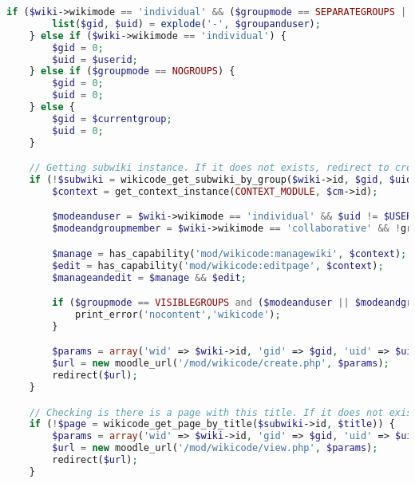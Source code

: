 \begin{lstlisting}[language=PHP]
    if ($wiki->wikimode == 'individual' && ($groupmode == SEPARATEGROUPS || $groupmode == VISIBLEGROUPS)) {
        list($gid, $uid) = explode('-', $groupanduser);
    } else if ($wiki->wikimode == 'individual') {
        $gid = 0;
        $uid = $userid;
    } else if ($groupmode == NOGROUPS) {
        $gid = 0;
        $uid = 0;
    } else {
        $gid = $currentgroup;
        $uid = 0;
    }

    // Getting subwiki instance. If it does not exists, redirect to create page
    if (!$subwiki = wikicode_get_subwiki_by_group($wiki->id, $gid, $uid)) {
        $context = get_context_instance(CONTEXT_MODULE, $cm->id);

        $modeanduser = $wiki->wikimode == 'individual' && $uid != $USER->id;
        $modeandgroupmember = $wiki->wikimode == 'collaborative' && !groups_is_member($gid);

        $manage = has_capability('mod/wikicode:managewiki', $context);
        $edit = has_capability('mod/wikicode:editpage', $context);
        $manageandedit = $manage && $edit;

        if ($groupmode == VISIBLEGROUPS and ($modeanduser || $modeandgroupmember) and !$manageandedit) {
            print_error('nocontent','wikicode');
        }

        $params = array('wid' => $wiki->id, 'gid' => $gid, 'uid' => $uid, 'title' => $title);
        $url = new moodle_url('/mod/wikicode/create.php', $params);
        redirect($url);
    }

    // Checking is there is a page with this title. If it does not exists, redirect to first page
    if (!$page = wikicode_get_page_by_title($subwiki->id, $title)) {
        $params = array('wid' => $wiki->id, 'gid' => $gid, 'uid' => $uid, 'title' => $wiki->firstpagetitle);
        $url = new moodle_url('/mod/wikicode/view.php', $params);
        redirect($url);
    }


\end{lstlisting}
